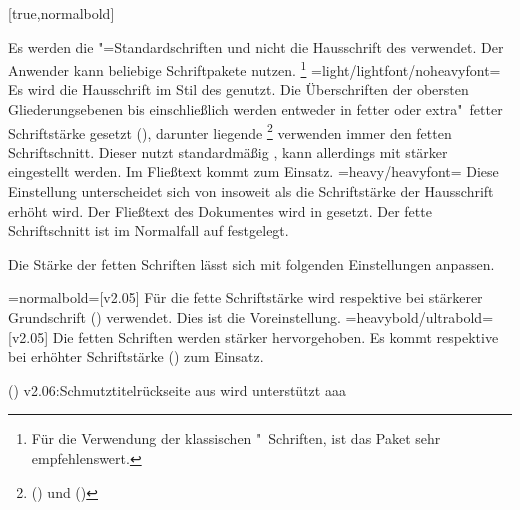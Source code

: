 \documentclass[english,ngerman,ttfont=roboto]{tudscrmanual}
\begin{document}
\begin{Declaration}[v2.00]{}[true,normalbold]%
\printdeclarationlist%
%
\begin{DeclarationValues}
\itemvalfalse
  Es werden die "=Standardschriften und nicht die Hausschrift 
  des \CDs verwendet. Der Anwender kann beliebige Schriftpakete nutzen.%
  \footnote{%
    Für die Verwendung der klassischen "~Schriften, ist das Paket 
     sehr empfehlenswert.%
  }
\itemvaltrue*=light/lightfont/noheavyfont=
  Es wird die Hausschrift \OpenSans im Stil des \CDs genutzt. Die Überschriften 
  der obersten Gliederungsebenen bis einschließlich  
  werden entweder in fetter oder extra"~fetter Schriftstärke gesetzt 
  (), darunter liegende%
  \footnote{%
    () und 
    ()%
  } verwenden immer den fetten Schriftschnitt. Dieser nutzt standardmäßig 
  , kann allerdings mit  
  stärker eingestellt werden. Im Fließtext kommt  zum 
  Einsatz.
\itemval=heavy/heavyfont=
  Diese Einstellung unterscheidet sich von  insoweit als 
  die Schriftstärke der Hausschrift erhöht wird. Der Fließtext des Dokumentes 
  wird in  gesetzt. Der fette Schriftschnitt ist im 
  Normalfall auf  festgelegt.
\end{DeclarationValues}
%
Die Stärke der fetten Schriften lässt sich mit folgenden Einstellungen anpassen.
%
\begin{DeclarationValues}
\itemval=normalbold=[v2.05]
  Für die fette Schriftstärke wird  respektive bei 
  stärkerer Grundschrift () 
  verwendet. Dies ist die Voreinstellung.
\itemval=heavybold/ultrabold=[v2.05]
  Die fetten Schriften werden stärker hervorgehoben. Es kommt 
   respektive  bei 
  erhöhter Schriftstärke () zum Einsatz.
\end{DeclarationValues}
\end{Declaration}

\begin{Entity}{}
(){%
  v2.06:Schmutztitelrückseite aus  wird unterstützt%
}%
aaa
\end{Entity}
\end{document}
